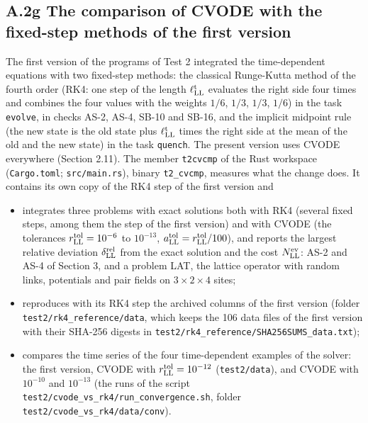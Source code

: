 \documentclass[
  10pt,
]{article}
\providecommand{\tightlist}{%
  \setlength{\itemsep}{0pt}\setlength{\parskip}{0pt}}
\begin{document}
\hypertarget{a.2g-the-comparison-of-cvode-with-the-fixed-step-methods-of-the-first-version}{%
\subsection{A.2g The comparison of CVODE with the fixed-step methods of
the first
version}\label{a.2g-the-comparison-of-cvode-with-the-fixed-step-methods-of-the-first-version}}

The first version of the programs of Test 2 integrated the
time-dependent equations with two fixed-step methods: the classical
Runge-Kutta method of the fourth order (RK4: one step of the length
\(\ell^{\rm t}_{\rm LL}\) evaluates the right side four times and
combines the four values with the weights \(1/6\), \(1/3\), \(1/3\),
\(1/6\)) in the task \texttt{evolve}, in checks AS-2, AS-4, SB-10 and
SB-16, and the implicit midpoint rule (the new state is the old state
plus \(\ell^{\rm t}_{\rm LL}\) times the right side at the mean of the
old and the new state) in the task \texttt{quench}. The present version
uses CVODE everywhere (Section 2.11). The member \texttt{t2cvcmp} of the
Rust workspace (\texttt{Cargo.toml}; \texttt{src/main.rs}), binary
\texttt{t2\_cvcmp}, measures what the change does. It contains its own
copy of the RK4 step of the first version and

\begin{itemize}
\tightlist
\item
  integrates three problems with exact solutions both with RK4 (several
  fixed steps, among them the step of the first version) and with CVODE
  (the tolerances \(r^{\rm tol}_{\rm LL}=10^{-6}\) to \(10^{-13}\),
  \(a^{\rm tol}_{\rm LL}=r^{\rm tol}_{\rm LL}/100\)), and reports the
  largest relative deviation \(\delta^{\rm rel}_{\rm LL}\) from the
  exact solution and the cost \(N^{\rm ev}_{\rm LL}\): AS-2 and AS-4 of
  Section 3, and a problem LAT, the lattice operator with random links,
  potentials and pair fields on \(3\times2\times4\) sites;
\item
  reproduces with its RK4 step the archived columns of the first version
  (folder \texttt{test2/rk4\_reference/data}, which keeps the 106 data
  files of the first version with their SHA-256 digests in
  \texttt{test2/rk4\_reference/SHA256SUMS\_data.txt});
\item
  compares the time series of the four time-dependent examples of the
  solver: the first version, CVODE with
  \(r^{\rm tol}_{\rm LL}=10^{-12}\) (\texttt{test2/data}), and CVODE
  with \(10^{-10}\) and \(10^{-13}\) (the runs of the script
  \texttt{test2/cvode\_vs\_rk4/run\_convergence.sh}, folder
  \texttt{test2/cvode\_vs\_rk4/data/conv}).
\end{itemize}
\end{document}
